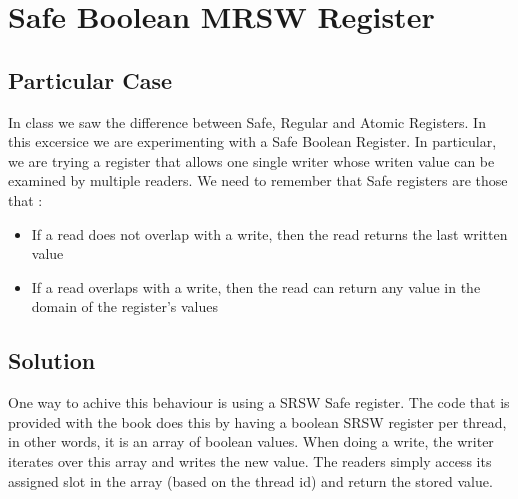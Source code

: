 \section{\textbf{Safe Boolean MRSW Register}}
\subsection{Particular Case}
\par
In class we saw the difference between Safe, Regular and Atomic Registers. In
this excersice we are experimenting with a Safe Boolean Register. In particular,
we are trying a register that allows one single writer whose writen value can be
examined by multiple readers. We need to remember that Safe registers are those
that :
\begin{itemize}
\item If a read does not overlap with a write, then the read returns the last
written value
\item If a read overlaps with a write, then the read can return any value in the
domain of the register's values
\end{itemize}
\subsection{Solution}
\par
One way to achive this behaviour is using a SRSW Safe register. The code that is
provided with the book does this by having a boolean SRSW register per thread,
in other words, it is an array of boolean values. When doing a write, the writer
iterates over this array and writes the new value. The readers simply access its
assigned slot in the array (based on the thread id) and return the stored value. 
